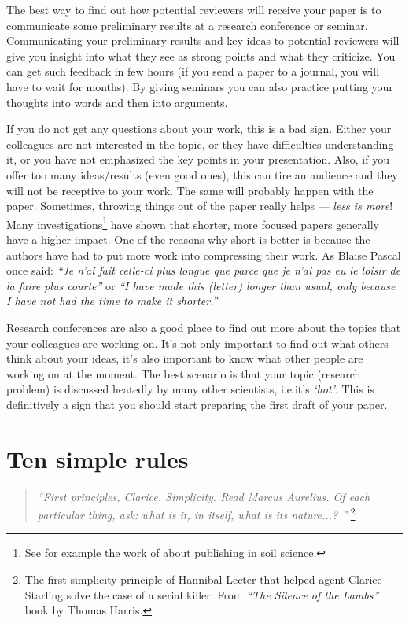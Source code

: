 \documentclass[graybox,envcountchap,sectrefs,UStrade]{svmono}
\begin{document}
The best way to find out how potential reviewers will receive your paper is to communicate some preliminary results at a research conference or seminar. Communicating your preliminary results and key ideas to potential reviewers will give you insight into what they see as strong points and what they criticize. You can get such feedback in few hours (if you send a paper to a journal, you will have to wait for months). By giving seminars you can also practice putting your thoughts into words and then into arguments.\par

If you do not get any questions about your work, this is a bad sign. Either your colleagues are not interested in the topic, or they have difficulties understanding it, or you have not emphasized the key points in your presentation. Also, if you offer too many ideas/results (even good ones), this can tire an audience and they will not be receptive to your work. The same will probably happen with the paper. Sometimes, throwing things out of the paper really helps --- \emph{less is more}! Many investigations\footnote{See for example the work of \citet{Hartemink2002S} about publishing in soil science.} have shown that shorter, more focused papers generally have a higher impact. One of the reasons why short is better is because the authors have had to put more work into compressing their work. As Blaise Pascal once said: \emph{``Je n'ai fait celle-ci plus longue que parce que je n'ai pas eu le loisir de la faire plus courte''} or \emph{``I have made this (letter) longer than usual, only because I have not had the time to make it shorter.''} \par

Research conferences are also a good place to find out more about the topics that your colleagues are working on. It's not only important to find out what others think about your ideas, it's also important to know what other people are working on at the moment. The best scenario is that your topic (research problem) is discussed heatedly by many other scientists, i.e.\@ it's \emph{`hot'}. This is definitively a sign that you should start preparing the first draft of your paper. \par


\section{Ten simple rules}

\begin{quote}
\emph{``First principles, Clarice. Simplicity. Read Marcus Aurelius. Of each particular thing, ask: what is it, in itself, what is its nature...? ''} \footnote{The first simplicity principle of Hannibal Lecter that helped agent Clarice Starling solve the case of a serial killer. From \emph{``The Silence of the Lambs''} book by Thomas Harris.}
\end{quote}
\end{document}
